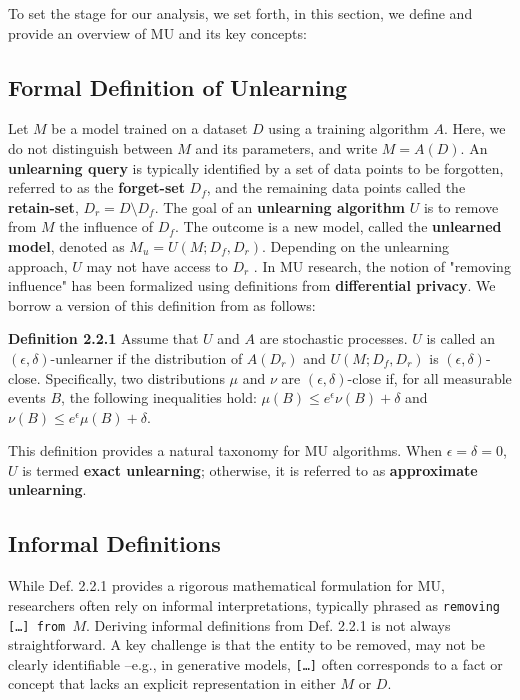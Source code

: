 To set the stage for our analysis, we set forth, in this section, we define and provide an overview of MU and its key concepts: 

\subsection{Formal Definition of Unlearning}
Let \( M \) be a model trained on a dataset \( D \) using a training algorithm \( A \). Here, we do not distinguish between \( M \) and its parameters, and write \( M = A(D) \). An \textbf{unlearning query} is typically identified by a set of data points to be forgotten, referred to as the \textbf{forget-set} \( D_f \), and the remaining data points called the \textbf{retain-set}, \( D_r = D \setminus D_f \). The goal of an \textbf{unlearning algorithm} \( U \) is to remove from \( M \) the influence of \( D_f \). The outcome is a new model, called the \textbf{unlearned model}, denoted as \( M_u = U(M; D_f, D_r) \). Depending on the unlearning approach, \( U \) may not have access to \( D_r \) \cite{zhao2024unlearningdifficulty}. In MU research, the notion of "removing influence" has been formalized using definitions from \textbf{differential privacy}. We borrow a version of this definition from \citep{ginart2019makingaiforget} as follows:


\textbf{Definition 2.2.1} Assume that \(U\) and \( A \) are stochastic processes. \(U\) is called an \((\epsilon, \delta)\)-unlearner if the distribution of \( A(D_r) \) and \( U(M; D_f, D_r) \) is \((\epsilon, \delta)\)-close. Specifically, two distributions \( \mu \) and \( \nu \) are \((\epsilon, \delta)\)-close if, for all measurable events \( B \), the following inequalities hold: \(\mu(B) \leq e^\epsilon \nu(B) + \delta\) and \(
\nu(B) \leq e^\epsilon \mu(B) + \delta
\).

This definition provides a natural taxonomy for MU algorithms. When \( \epsilon = \delta = 0 \), \( U \) is termed \textbf{exact unlearning}; otherwise, it is referred to as \textbf{approximate unlearning}.

\subsection{Informal Definitions}
While Def. 2.2.1 provides a rigorous mathematical formulation for MU, researchers often rely on informal interpretations, typically phrased as \texttt{removing [\dots] from $M$}. Deriving informal definitions from Def. 2.2.1 is not always straightforward. A key challenge is that the entity to be removed, may not be clearly identifiable --e.g., in generative models, \texttt{[\dots]} often corresponds to a fact or concept that lacks an explicit representation in either $M$ or $D$.

